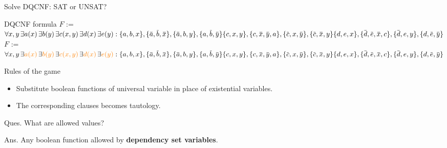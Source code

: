 \documentclass[xcolor=table	]{beamer}
\newcommand{\ov}[1]{\mkern 1.5mu\overline{\mkern-1.5mu#1\mkern-1.5mu}\mkern 1.5mu}
\begin{document}
\begin{frame}{Solve DQCNF: SAT or UNSAT?}


	\begin{alertblock}{DQCNF formula}
	{		
		\only<1,3-6> {
			$F$ :=	$ \forall x, y \, \exists a(x) \, \exists  b(y) \, \exists c(x,y) \, \exists d(x) \, \exists e(y) :
			\{a,b,x\}, \{\ov{a},\ov{b},\ov{x}\}, \{\ov{a},b,y\}, \{a,\ov{b},\ov{y}\}  \newline 
			\{c,x,y\}, \{c,\ov{x},\ov{y}, a\}, \{\ov{c},x,\ov{y}\}, \{\ov{c},\ov{x},y\} \newline 
			\{d,e,x\}, \{\ov{d},\ov{e},\ov{x}, c\}, \{\ov{d},e,y\}, \{d,\ov{e},\ov{y}\} $
		}
		\only<2,7> {
		$F$ :=	$ \forall x, y \, \exists \textcolor{orange}{a(x)} \, \exists  \textcolor{orange}{b(y)} \, \exists \textcolor{orange}{c(x,y)} \, \exists \textcolor{orange}{d(x)} \, \exists \textcolor{orange}{e(y)} :
		\{a,b,x\}, \{\ov{a},\ov{b},\ov{x}\}, \{\ov{a},b,y\}, \{a,\ov{b},\ov{y}\}  \newline 
		\{c,x,y\}, \{c,\ov{x},\ov{y}, a\}, \{\ov{c},x,\ov{y}\}, \{\ov{c},\ov{x},y\} \newline 
		\{d,e,x\}, \{\ov{d},\ov{e},\ov{x}, c\}, \{\ov{d},e,y\}, \{d,\ov{e},\ov{y}\} $
	}
	}
\end{alertblock}
\pause \pause

Rules of the game \\

\begin{itemize}
	\pause 
	
	\item Substitute boolean functions of universal variable in place of existential variables.
	\pause
	
	\item The corresponding clauses becomes tautology.
\end{itemize}
\pause
 
Ques. What are allowed values? \\
\pause

Ans. Any boolean function allowed by \textbf{dependency set variables}.
\end{frame}
\end{document}
